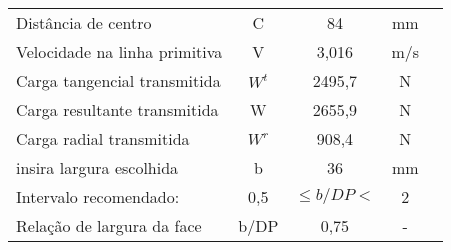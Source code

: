 \begin{table}[!htb]
\begin{tabular}{l c c c c}
Distância de centro                     & C                & 84              & mm             \\
Velocidade na linha primitiva           & V                & 3,016           & m/s            \\
Carga tangencial transmitida            & $W^t$            & 2495,7          & N              \\
Carga resultante transmitida            & W                & 2655,9          & N              \\
Carga radial transmitida                & $W^r$            & 908,4           & N              \\
insira largura escolhida                & b                & 36              & mm             \\ \hline
Intervalo recomendado:                  & 0,5              &$\leq b/DP<$     & 2              \\ \hline
Relação de largura da face              & b/DP             & 0,75            & -              \\ \hline
\end{tabular}
\end{table}